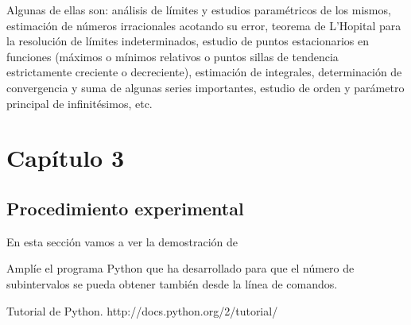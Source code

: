 \documentclass[spanish,a4paper,10pt]{article}
\begin{document}
Algunas de ellas son: análisis de límites y estudios paramétricos de los mismos, estimación de números irracionales acotando su error, teorema de L'Hopital para la resolución de límites indeterminados, estudio de puntos estacionarios en funciones (máximos o mínimos relativos o puntos sillas de tendencia estrictamente creciente o decreciente), estimación de integrales, determinación de convergencia y suma de algunas series importantes, estudio de orden y parámetro principal de infinitésimos, etc.

\section{Capítulo 3}
\subsection{\bf Procedimiento experimental}
En esta sección vamos a ver la demostración de

Amplíe el programa \textsf{Python} que ha desarrollado para que el número de
subintervalos se pueda obtener también desde la línea de comandos.

\begin{thebibliography}{1}
 Tutorial de Python. http://docs.python.org/2/tutorial/
\end{thebibliography}
\end{document}
